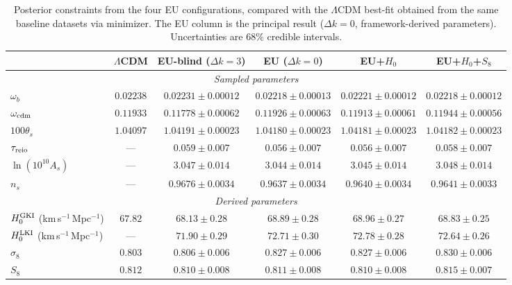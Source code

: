 \documentclass[a4paper,fleqn]{cas-dc}
\begin{document}
\begin{table}[t]
\caption{Posterior constraints from the four EU configurations,
compared with the $\Lambda$CDM best-fit obtained from the same
baseline datasets via minimizer. The EU column is the principal
result ($\Delta k = 0$, framework-derived parameters).
Uncertainties are $68\%$ credible intervals.}
\label{tab:mcmc}
\begin{tabular}{lccccc}
 & $\Lambda$CDM & EU-blind ($\Delta k{=}3$)
 & \textbf{EU} ($\Delta k{=}0$) & EU+$H_0$ & EU+$H_0$+$S_8$ \\
\hline
\multicolumn{6}{c}{\textit{Sampled parameters}} \\
$\omega_b$
  & $0.02238$ & $0.02231 \pm 0.00012$
  & $\mathbf{0.02218 \pm 0.00013}$ & $0.02221 \pm 0.00012$
  & $0.02218 \pm 0.00012$ \\
$\omega_{\rm cdm}$
  & $0.11933$ & $0.11778 \pm 0.00062$
  & $\mathbf{0.11926 \pm 0.00063}$ & $0.11913 \pm 0.00061$
  & $0.11944 \pm 0.00056$ \\
$100\theta_s$
  & $1.04097$ & $1.04191 \pm 0.00023$
  & $\mathbf{1.04180 \pm 0.00023}$ & $1.04181 \pm 0.00023$
  & $1.04182 \pm 0.00023$ \\
$\tau_{\rm reio}$
  & --- & $0.059 \pm 0.007$
  & $\mathbf{0.056 \pm 0.007}$ & $0.056 \pm 0.007$
  & $0.058 \pm 0.007$ \\
$\ln(10^{10}A_s)$
  & --- & $3.047 \pm 0.014$
  & $\mathbf{3.044 \pm 0.014}$ & $3.045 \pm 0.014$
  & $3.048 \pm 0.014$ \\
$n_s$
  & --- & $0.9676 \pm 0.0034$
  & $\mathbf{0.9637 \pm 0.0034}$ & $0.9640 \pm 0.0034$
  & $0.9641 \pm 0.0033$ \\[4pt]
\hline
\multicolumn{6}{c}{\textit{Derived parameters}} \\
$H_0^{\rm GKI}$ (km\,s$^{-1}$\,Mpc$^{-1}$)
  & $67.82$ & $68.13 \pm 0.28$
  & $\mathbf{68.89 \pm 0.28}$ & $68.96 \pm 0.27$
  & $68.83 \pm 0.25$ \\
$H_0^{\rm LKI}$ (km\,s$^{-1}$\,Mpc$^{-1}$)
  & --- & $71.90 \pm 0.29$
  & $\mathbf{72.71 \pm 0.30}$ & $72.78 \pm 0.28$
  & $72.64 \pm 0.26$ \\
$\sigma_8$
  & $0.803$ & $0.806 \pm 0.006$
  & $\mathbf{0.827 \pm 0.006}$ & $0.827 \pm 0.006$
  & $0.830 \pm 0.006$ \\
$S_8$
  & $0.812$ & $0.810 \pm 0.008$
  & $\mathbf{0.811 \pm 0.008}$ & $0.810 \pm 0.008$
  & $0.815 \pm 0.007$ \\

\end{tabular}
\end{table}
\end{document}
